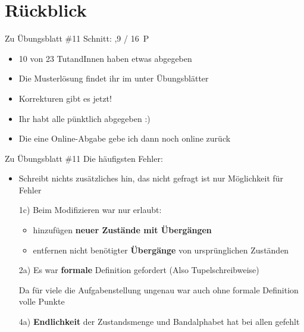 
\newcommand{\handout}{}



\morescalingdelimiters



\section{Rückblick}

\begin{frame}{Zu Übungsblatt \#11}
	Schnitt: ,9 / 16~P

	\begin{itemize}[<+->]
		\item 10 von 23 TutandInnen haben etwas abgegeben
		\item Die Musterlösung findet ihr im \ILIAS unter Übungsblätter
		\item Korrekturen gibt es jetzt!
		\item Ihr habt alle pünktlich abgegeben :)
		\item Die eine Online-Abgabe gebe ich dann noch online zurück
	\end{itemize}
\end{frame}

\begin{frame}{Zu Übungsblatt \#11}
	Die häufigsten Fehler:
	\begin{itemize}[<+->]
		\item Schreibt nichts zusätzliches hin, das nicht gefragt ist \impl nur Möglichkeit für Fehler
		\item[1c)] Beim Modifizieren war nur erlaubt: 
		\begin{itemize}
			\item hinzufügen \textbf{neuer Zustände mit Übergängen}
			\item entfernen nicht benötigter \textbf{Übergänge} von ursprünglichen Zuständen
		\end{itemize}
		\item[2a)] Es war \textbf{formale} Definition gefordert (Also Tupelschreibweise)
		\item[] Da für viele die Aufgabenstellung ungenau war \impl auch ohne formale Definition volle Punkte 
		\item[4a)] \textbf{Endlichkeit} der Zustandsmenge und Bandalphabet hat bei allen gefehlt
	\end{itemize}
\end{frame}

